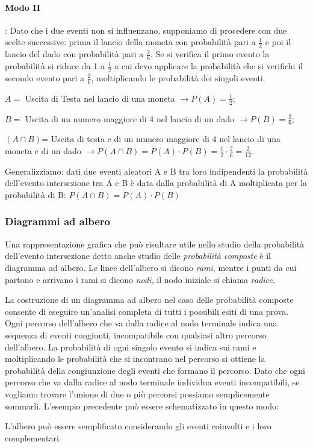 \begin{exrig}
\begin{esempio}
\begin{center}
 
\end{center}

\paragraph{Modo II}: Dato che i due eventi non si influenzano, supponiamo di procedere con due scelte successive: prima il lancio della moneta con probabilità pari a $\frac 1 2$ e poi il lancio del dado con probabilità pari a $\frac 2 6$. Se si verifica il primo evento la probabilità si riduce da 1 a $\frac 1 2$ a cui devo applicare la probabilità che si verifichi il secondo evento pari a $\frac 2 6$, moltiplicando le probabilità dei singoli eventi.
\begin{itemize*}
\item $ A = $ Uscita di Testa nel lancio di una moneta $\to P(A)=\frac 1 2$;
\item $ B = $ Uscita di un numero maggiore di 4 nel lancio di un dado $\to P(B)=\frac 2 6$;
\item $(A\cap B)$= Uscita di testa e di un numero maggiore di 4 nel lancio di una moneta e di un dado $\to P(A\cap B)=P(A)\cdot P(B)=\frac 1 2\cdot \frac 2 6=\frac 2{12}$.
\end{itemize*}
\end{esempio}
\end{exrig}

Generalizziamo: dati due eventi aleatori A e B tra loro indipendenti la probabilità dell'evento intersezione tra A e B è data dalla probabilità di A moltiplicata per la probabilità di B: $P(A\cap B)=P(A)\cdot P(B)$
\subsubsection*{Diagrammi ad albero}
Una rappresentazione grafica che può risultare utile nello studio della probabilità dell'evento intersezione detto anche studio delle \emph{probabilità composte} è il diagramma ad albero. Le linee dell'albero si dicono \emph{rami}, mentre i punti da cui partono e arrivano i rami si dicono \emph{nodi,} il nodo iniziale si chiama \emph{radice}.

La costruzione di un diagramma ad albero nel caso delle probabilità composte consente di eseguire un'analisi completa di tutti i possibili esiti di una prova. Ogni percorso dell'albero che va dalla radice al nodo terminale indica una sequenza di eventi congiunti, incompatibile con qualsiasi altro percorso dell'albero. La probabilità di ogni singolo evento si indica sui rami e moltiplicando le probabilità che si incontrano nel percorso si ottiene la probabilità della congiunzione degli eventi che formano il percorso. Dato che ogni percorso che va dalla radice al nodo terminale individua eventi incompatibili, se vogliamo trovare l'unione di due o più percorsi possiamo semplicemente sommarli.
L'esempio precedente può essere schematizzato in questo modo:
\begin{center}
 
\end{center}
L'albero può essere semplificato considerando gli eventi coinvolti e i loro complementari.

